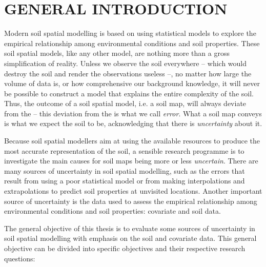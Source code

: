 \setcounter{page}{1}
\artigofalse
\chapter{GENERAL INTRODUCTION}
\label{chap:chap01}

Modern soil spatial modelling is based on using statistical models to explore the empirical relationship among 
environmental conditions and soil properties. These soil spatial models, like any other model, are nothing 
more than a gross simplification of reality. Unless we observe the soil everywhere -- which would destroy the 
soil and render the observations useless --, no matter how large the volume of data is, or how comprehensive 
our background knowledge, it will never be possible to construct a model that explains the entire complexity 
of the soil. Thus, the outcome of a soil spatial model, i.e. a soil map, will always deviate from the 
 -- this deviation from the  is what we call \emph{error}. What a soil map conveys is what 
we expect the soil to be, acknowledging that there is \emph{uncertainty} about it.

Because soil spatial modellers aim at using the available resources to produce the most accurate 
representation of the soil, a sensible research programme is to investigate the main causes for soil maps 
being more or less \emph{uncertain}. There are many sources of uncertainty in soil spatial modelling, such as 
the errors that result from using a poor statistical model or from making interpolations and extrapolations 
to predict soil properties at unvisited locations. Another important source of uncertainty is the data used to 
assess the empirical relationship among environmental conditions and soil properties: covariate and soil data.

The general objective of this thesis is to evaluate some sources of uncertainty in soil spatial modelling with 
emphasis on the soil and covariate data. This general objective can be divided into specific objectives and 
their respective research questions:

